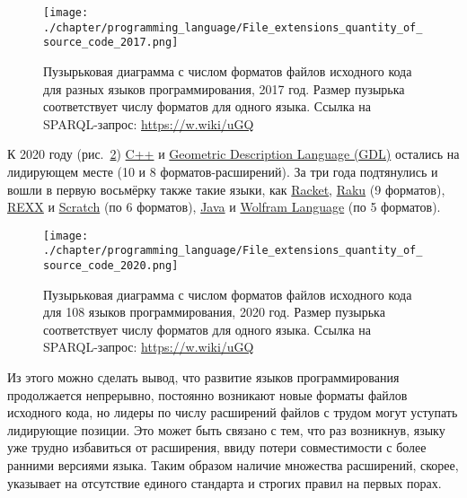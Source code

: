 \begin{figure}
\centering
	\texttt{[image: ./chapter/programming\_language/File\_extensions\_quantity\_of\_source\_code\_2017.png]}
	\label{fig:source_format_2017}
    \caption[Пузырьковая диаграмма с числом форматов файлов исходного кода для разных языков программирования, 2017 год.]{Пузырьковая диаграмма с числом форматов файлов исходного кода для разных языков программирования, 2017 год. Размер пузырька соответствует числу форматов для одного языка. Ссылка на SPARQL-запрос: \href{https://w.wiki/uGQ}{https://w.wiki/uGQ}}
\end{figure}
К 2020 году (рис.~\ref{fig:source_format_2020}) \href{https://en.wikipedia.org/wiki/C++}{C++} и \href{https://en.wikipedia.org/wiki/Geometric_Description_Language}{Geometric Description Language (GDL)} остались на лидирующем месте (10 и 8 форматов-расширений). За три года подтянулись и вошли в первую восьмёрку также такие языки, как \href{https://ru.wikipedia.org/wiki/Racket_(язык_программирования)}{Racket}, \href{https://en.wikipedia.org/wiki/Raku_(programming_language)}{Raku} (9 форматов), \href{https://en.wikipedia.org/wiki/Rexx}{REXX} и \href{https://en.wikipedia.org/wiki/Scratch_(programming_language)}{Scratch} (по 6 форматов), \href{https://ru.wikipedia.org/wiki/Java}{Java} и \href{https://en.wikipedia.org/wiki/Wolfram_Language}{Wolfram Language} (по 5 форматов).
\begin{figure}
\centering
	\texttt{[image: ./chapter/programming\_language/File\_extensions\_quantity\_of\_source\_code\_2020.png]}
	\label{fig:source_format_2020}
	\caption[Пузырьковая диаграмма с числом форматов файлов исходного кода для 108 языков программирования, 2020 год.]{Пузырьковая диаграмма с числом форматов файлов исходного кода для 108 языков программирования, 2020 год. Размер пузырька соответствует числу форматов для одного языка. Ссылка на SPARQL-запрос: \href{https://w.wiki/uGQ}{https://w.wiki/uGQ}}
\end{figure}

Из этого можно сделать вывод, что развитие языков программирования продолжается непрерывно, постоянно возникают новые форматы файлов исходного кода, но лидеры по числу расширений файлов с трудом могут уступать лидирующие позиции. Это может быть связано с тем, что раз возникнув, языку уже трудно избавиться от расширения, ввиду потери совместимости с более ранними версиями языка. Таким образом наличие множества расширений, скорее, указывает на отсутствие единого стандарта и строгих правил на первых порах.








